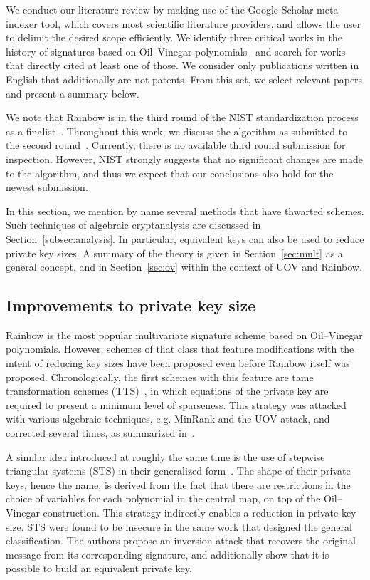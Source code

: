 \documentclass[12pt, a4paper, oneside]{memoir}
\theoremstyle{definition}
\begin{document}
We conduct our literature review by making use of the Google Scholar meta-indexer tool, which covers most scientific literature providers, and allows the user to delimit the desired scope efficiently. We identify three critical works in the history of signatures based on Oil--Vinegar polynomials~\cite{Patarin:199709,Kipnis:199904,Ding:200506} and search for works that directly cited at least one of those. We consider only publications written in English that additionally are not patents. From this set, we select relevant papers and present a summary below.

We note that Rainbow is in the third round of the NIST standardization process as a finalist~\cite[Sec.~3.20]{Alagic:202007}. Throughout this work, we discuss the algorithm as submitted to the second round~\cite{Ding:201901}. Currently, there is no available third round submission for inspection. However, NIST strongly suggests that no significant changes are made to the algorithm, and thus we expect that our conclusions also hold for the newest submission.

In this section, we mention by name several methods that have thwarted schemes. Such techniques of algebraic cryptanalysis are discussed in Section~\ref{subsec:analysis}. In particular, equivalent keys can also be used to reduce private key sizes. A summary of the theory is given in Section~\ref{sec:mult} as a general concept, and in Section~\ref{sec:ov} within the context of UOV and Rainbow.

\subsection{Improvements to private key size}\label{subsec:priv}

Rainbow is the most popular multivariate signature scheme based on Oil--Vinegar polynomials. However, schemes of that class that feature modifications with the intent of reducing key sizes have been proposed even before Rainbow itself was proposed. Chronologically, the first schemes with this feature are tame transformation schemes (TTS)~\cite{Chen:200210}, in which equations of the private key are required to present a minimum level of sparseness. This strategy was attacked with various algebraic techniques, e.g. MinRank and the UOV attack, and corrected several times, as summarized in~\cite{Ding:200604}.

A similar idea introduced at roughly the same time is the use of stepwise triangular systems (STS) in their generalized form~\cite{Wolf:200603}. The shape of their private keys, hence the name, is derived from the fact that there are restrictions in the choice of variables for each polynomial in the central map, on top of the Oil--Vinegar construction. This strategy indirectly enables a reduction in private key size. STS were found to be insecure in the same work that designed the general classification. The authors propose an inversion attack that recovers the original message from its corresponding signature, and additionally show that it is possible to build an equivalent private key.
\end{document}
